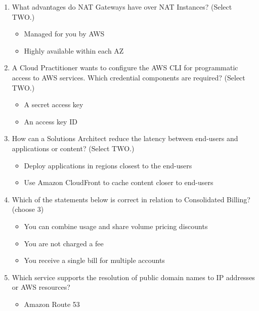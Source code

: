 \begin{enumerate}
	\item What advantages do NAT Gateways have over NAT Instances? (Select TWO.)

	\begin{itemize}
	\item Managed for you by AWS
	\item Highly available within each AZ
\end{itemize}

	\item A Cloud Practitioner wants to configure the AWS CLI for programmatic access to AWS services. Which credential components are required? (Select TWO.)

	\begin{itemize}
	\item A secret access key
	\item An access key ID
\end{itemize}

	\item How can a Solutions Architect reduce the latency between end-users and applications or content? (Select TWO.)

	\begin{itemize}
	\item Deploy applications in regions closest to the end-users
	\item Use Amazon CloudFront to cache content closer to end-users
\end{itemize}

	\item Which of the statements below is correct in relation to Consolidated Billing? (choose 3)

	\begin{itemize}
	\item You can combine usage and share volume pricing discounts
	\item You are not charged a fee
	\item You receive a single bill for multiple accounts
\end{itemize}

	\item Which service supports the resolution of public domain names to IP addresses or AWS resources?

	\begin{itemize}
	\item Amazon Route 53
\end{itemize}


\end{enumerate}
